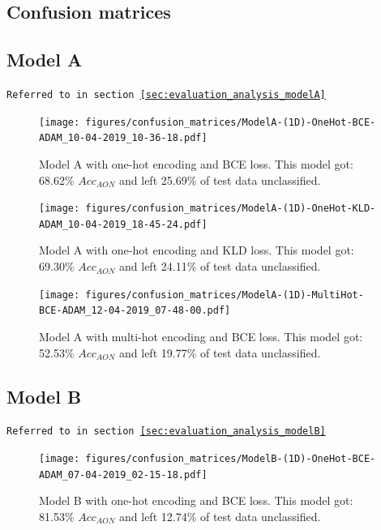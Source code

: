 \begin{appendices}
    \newpage
    \section{Confusion matrices}
        \subsection{Model A}
        \label{app:modelA_confusion_matrix}
        \texttt{Referred to in section \ref{sec:evaluation_analysis_modelA}}
            \begin{figure}[H]
                \centering
                \texttt{[image: figures/confusion\_matrices/ModelA-(1D)-OneHot-BCE-ADAM\_10-04-2019\_10-36-18.pdf]}
                \caption*{Model A with one-hot encoding and BCE loss. This model got:  68.62\% $Acc_{AON}$ and left 25.69\% of test data unclassified.}
            \end{figure}
            
            \begin{figure}[H]
                \centering
                \texttt{[image: figures/confusion\_matrices/ModelA-(1D)-OneHot-KLD-ADAM\_10-04-2019\_18-45-24.pdf]}
                \caption*{Model A with one-hot encoding and KLD loss. This model got:  69.30\% $Acc_{AON}$ and left 24.11\% of test data unclassified.}
            \end{figure}
            
            \begin{figure}[H]
                \centering
                \texttt{[image: figures/confusion\_matrices/ModelA-(1D)-MultiHot-BCE-ADAM\_12-04-2019\_07-48-00.pdf]}
                \caption*{Model A with multi-hot encoding and BCE loss. This model got:  52.53\% $Acc_{AON}$ and left 19.77\% of test data unclassified.}
            \end{figure}
        \newpage
        \subsection{Model B}
        \label{app:modelB_confusion_matrix}
        \texttt{Referred to in section \ref{sec:evaluation_analysis_modelB}}
            \begin{figure}[H]
                \centering
                \texttt{[image: figures/confusion\_matrices/ModelB-(1D)-OneHot-BCE-ADAM\_07-04-2019\_02-15-18.pdf]}
                \caption*{Model B with one-hot encoding and BCE loss. This model got:  81.53\% $Acc_{AON}$ and left 12.74\% of test data unclassified.}
            \end{figure}
            

\end{appendices}
